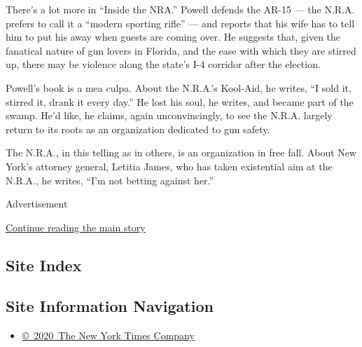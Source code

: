 There's a lot more in ``Inside the NRA.'' Powell defends the AR-15 ---
the N.R.A. prefers to call it a ``modern sporting rifle'' --- and
reports that his wife has to tell him to put his away when guests are
coming over. He suggests that, given the fanatical nature of gun lovers
in Florida, and the ease with which they are stirred up, there may be
violence along the state's I-4 corridor after the election.

Powell's book is a mea culpa. About the N.R.A.'s Kool-Aid, he writes,
``I sold it, stirred it, drank it every day.'' He lost his soul, he
writes, and became part of the swamp. He'd like, he claims, again
unconvincingly, to see the N.R.A. largely return to its roots as an
organization dedicated to gun safety.

The N.R.A., in this telling as in others, is an organization in free
fall. About New York's attorney general, Letitia James, who has taken
existential aim at the N.R.A., he writes, ``I'm not betting against
her.''

Advertisement

\protect\hyperlink{after-bottom}{Continue reading the main story}

\hypertarget{site-index}{%
\subsection{Site Index}\label{site-index}}

\hypertarget{site-information-navigation}{%
\subsection{Site Information
Navigation}\label{site-information-navigation}}

\begin{itemize}
\tightlist
\item
  \href{https://help.nytimes3xbfgragh.onion/hc/en-us/articles/115014792127-Copyright-notice}{©~2020~The
  New York Times Company}
\end{itemize}

